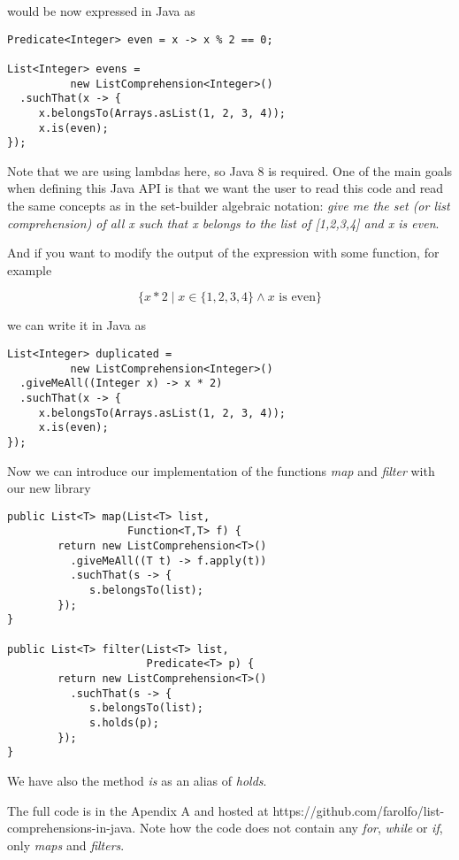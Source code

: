 \documentclass[%
 reprint,
 amsmath,amssymb,
 aps,
]{revtex4-1}
\begin{document}
    would be now expressed in Java as

    \begin{lstlisting}[frame=none]
Predicate<Integer> even = x -> x % 2 == 0;

List<Integer> evens =
          new ListComprehension<Integer>()
  .suchThat(x -> {
     x.belongsTo(Arrays.asList(1, 2, 3, 4));
     x.is(even);
});
    \end{lstlisting}

    Note that we are using lambdas here, so Java 8 is required.
    One of the main goals when defining this Java API is that we want the user to read this code and read the same concepts as in the set-builder algebraic notation: \emph{give me the set (or list comprehension) of all x such that x belongs to the list of [1,2,3,4] and x is even}.

    And if you want to modify the output of the expression with some function, for example

    \[
    \{ x * 2 \mid x \in \{1,2,3,4\} \wedge x \mbox{ is even} \}
    \]

    we can write it in Java as

    \begin{lstlisting}[frame=none]
List<Integer> duplicated =
          new ListComprehension<Integer>()
  .giveMeAll((Integer x) -> x * 2)
  .suchThat(x -> {
     x.belongsTo(Arrays.asList(1, 2, 3, 4));
     x.is(even);
});
    \end{lstlisting}

    Now we can introduce our implementation of the functions \emph{map} and \emph{filter} with our new library

    \begin{lstlisting}[frame=none]
public List<T> map(List<T> list,
                   Function<T,T> f) {
        return new ListComprehension<T>()
          .giveMeAll((T t) -> f.apply(t))
          .suchThat(s -> {
             s.belongsTo(list);
        });
}

public List<T> filter(List<T> list,
                      Predicate<T> p) {
        return new ListComprehension<T>()
          .suchThat(s -> {
             s.belongsTo(list);
             s.holds(p);
        });
}
    \end{lstlisting}

	We have also the method \emph{is} as an alias of \emph{holds}.

    The full code is in the Apendix A and hosted at https://github.com/farolfo/list-comprehensions-in-java. Note how the code does not contain any \emph{for}, \emph{while} or \emph{if}, only \emph{maps} and \emph{filters}.
\end{document}
